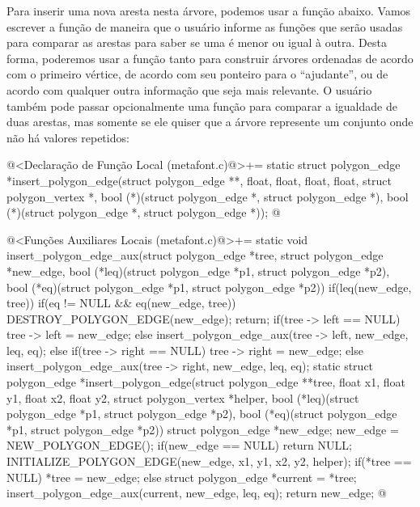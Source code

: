 {{{{{{Para inserir uma nova aresta nesta árvore, podemos usar a função
abaixo. Vamos escrever a função de maneira que o usuário informe as
funções que serão usadas para comparar as arestas para saber se uma é
menor ou igual à outra. Desta forma, poderemos usar a função tanto
para construir árvores ordenadas de acordo com o primeiro vértice, de
acordo com seu ponteiro para o ``ajudante'', ou de acordo com qualquer
outra informação que seja mais relevante. O usuário também pode passar
opcionalmente uma função para comparar a igualdade de duas arestas,
mas somente se ele quiser que a árvore represente um conjunto onde não
há valores repetidos:

\iniciocodigo
@<Declaração de Função Local (metafont.c)@>+=
static struct polygon_edge *insert_polygon_edge(struct polygon_edge **,
                                               float, float, float, float,
                                               struct polygon_vertex *,
                                            bool (*)(struct polygon_edge *,
                                                        struct polygon_edge *),
                                            bool (*)(struct polygon_edge *,
                                                       struct polygon_edge *));
@
\fimcodigo

\iniciocodigo
@<Funções Auxiliares Locais (metafont.c)@>+=
static void insert_polygon_edge_aux(struct polygon_edge *tree,
                                    struct polygon_edge *new_edge,
                                    bool (*leq)(struct polygon_edge *p1,
                                                struct polygon_edge *p2),
                                    bool (*eq)(struct polygon_edge *p1,
                                                struct polygon_edge *p2)){
  if(leq(new_edge, tree)){
    if(eq != NULL && eq(new_edge, tree)){
      DESTROY_POLYGON_EDGE(new_edge);
      return;
    }
    if(tree -> left == NULL)
      tree -> left = new_edge;
    else
      insert_polygon_edge_aux(tree -> left, new_edge, leq, eq);
  }
  else{
    if(tree -> right == NULL)
      tree -> right = new_edge;
    else
      insert_polygon_edge_aux(tree -> right, new_edge, leq, eq);
  }
}
static struct polygon_edge *insert_polygon_edge(struct polygon_edge **tree,
                                               float x1, float y1,
                                               float x2, float y2,
                                               struct polygon_vertex *helper,
                                         bool (*leq)(struct polygon_edge *p1,
                                                     struct polygon_edge *p2),
                                         bool (*eq)(struct polygon_edge *p1,
                                                    struct polygon_edge *p2)){
  struct polygon_edge *new_edge;
  new_edge = NEW_POLYGON_EDGE();
  if(new_edge == NULL)
    return NULL;
  INITIALIZE_POLYGON_EDGE(new_edge, x1, y1, x2, y2, helper);
  if(*tree == NULL)
    *tree = new_edge;
  else{
    struct polygon_edge *current = *tree;
    insert_polygon_edge_aux(current, new_edge, leq, eq);
  }
  return new_edge;
}
@
\fimcodigo


}}}}}}

